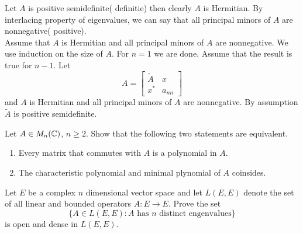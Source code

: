 \begin{solution}
    \justifying Let $A$ is positive semidefinite( definitie) then clearly $A$ is Hermitian. By interlacing property of eigenvalues, we can say that all principal minors of $A$ are nonnegative( positive).\\
    Assume that $A$ is Hermitian and all principal minors of $A$ are nonnegative. We use induction on the size of $A$. For $n=1$ we are done. Assume that the result is true for $n-1$. Let
    $$A=\begin{bmatrix}
        \tilde{A} & x \\
        x^* & a_{nn}
    \end{bmatrix}$$
    and $A$ is Hermitian and all principal minors of $A$ are nonnegative. By assumption $\tilde{A}$ is positive semidefinite. 
\end{solution}

\question Let $A\in M_n(\mathbb{C})$, $n\geq 2$. Show that the following two statements are equivalent.
\begin{enumerate}
    \item Every matrix that commutes with $A$ is a polynomial in $A$.
    \item The characteristic polynomial and minimal plynomial of $A$ coinsides.
\end{enumerate}

\question Let $E$ be a complex $n$ dimensional vector space and let $L(E,E)$ denote the set of all linear and bounded operators $A:E\to E$. Prove the set
$$
    \{A\in L(E,E):\text{$A$ has $n$ distinct engenvalues}\}
$$
is open and dense in $L(E,E)$.